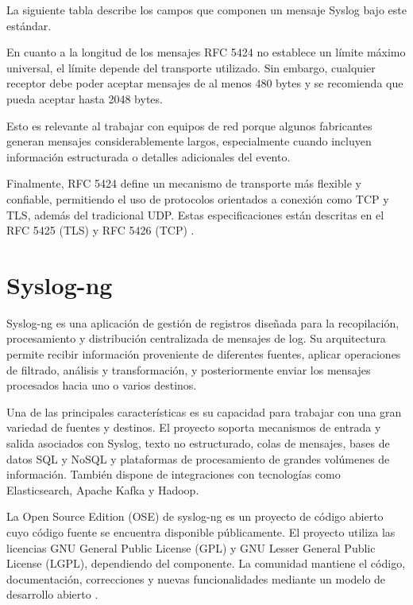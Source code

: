 La siguiente tabla describe los campos que componen un mensaje Syslog bajo este estándar.



En cuanto a la longitud de los mensajes RFC 5424 no establece un límite máximo universal, el límite depende del transporte utilizado. Sin embargo, cualquier receptor debe poder aceptar mensajes de al menos 480 bytes y se recomienda que pueda aceptar hasta 2048 bytes.

Esto es relevante al trabajar con equipos de red porque algunos fabricantes generan mensajes considerablemente largos, especialmente cuando incluyen información estructurada o detalles adicionales del evento.

Finalmente, RFC 5424 define un mecanismo de transporte más flexible y confiable, permitiendo el uso de protocolos orientados a conexión como TCP y TLS, además del tradicional UDP. Estas especificaciones están descritas en el RFC 5425 (TLS) \cite{rfc5425} y RFC 5426 (TCP) \cite{rfc5426}.

\section{Syslog-ng}
Syslog-ng es una aplicación de gestión de registros diseñada para la recopilación, procesamiento y distribución centralizada de mensajes de log. Su arquitectura permite recibir información proveniente de diferentes fuentes, aplicar operaciones de filtrado, análisis y transformación, y posteriormente enviar los mensajes procesados hacia uno o varios destinos.

Una de las principales características es su capacidad para trabajar con una gran variedad de fuentes y destinos. El proyecto soporta mecanismos de entrada y salida asociados con Syslog, texto no estructurado, colas de mensajes, bases de datos SQL y NoSQL y plataformas de procesamiento de grandes volúmenes de información. También dispone de integraciones con tecnologías como Elasticsearch, Apache Kafka y Hadoop.

La Open Source Edition (OSE) de syslog-ng es un proyecto de código abierto cuyo código fuente se encuentra disponible públicamente. El proyecto utiliza las licencias GNU General Public License (GPL) y GNU Lesser General Public License (LGPL), dependiendo del componente. La comunidad mantiene el código, documentación, correcciones y nuevas funcionalidades mediante un modelo de desarrollo abierto \cite{syslogng_community}.

